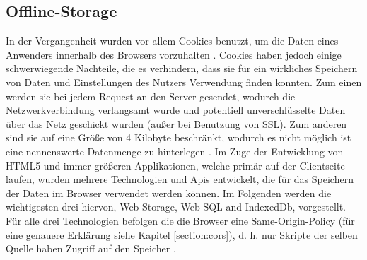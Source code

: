 \subsection{Offline-Storage}\label{section:offline_storage}
In der Vergangenheit wurden vor allem Cookies benutzt, um die Daten eines Anwenders innerhalb des Browsers vorzuhalten \cite{Mahemoff22010}. Cookies haben jedoch einige schwerwiegende Nachteile, die es verhindern, dass sie für ein wirkliches Speichern von Daten und Einstellungen des Nutzers Verwendung finden konnten. Zum einen werden sie bei jedem Request an den Server gesendet, wodurch die Netzwerkverbindung verlangsamt wurde und potentiell unverschlüsselte Daten über das Netz geschickt wurden (außer bei Benutzung von SSL). Zum anderen sind sie auf eine Größe von 4 Kilobyte beschränkt, wodurch es nicht möglich ist eine nennenswerte Datenmenge zu hinterlegen \cite{html5upandrunningchapter7}. Im Zuge der Entwicklung von HTML5 und immer größeren Applikationen, welche primär auf der Clientseite laufen, wurden mehrere Technologien und Apis entwickelt, die für das Speichern der Daten im Browser verwendet werden können. Im Folgenden werden die wichtigesten drei hiervon, Web-Storage, Web SQL and IndexedDb, vorgestellt. Für alle drei Technologien befolgen die die Browser eine Same-Origin-Policy (für eine genauere Erklärung siehe Kapitel \ref{section:cors}), d. h. nur Skripte der selben Quelle haben Zugriff auf den Speicher \cite{Mahemoff2010}.

